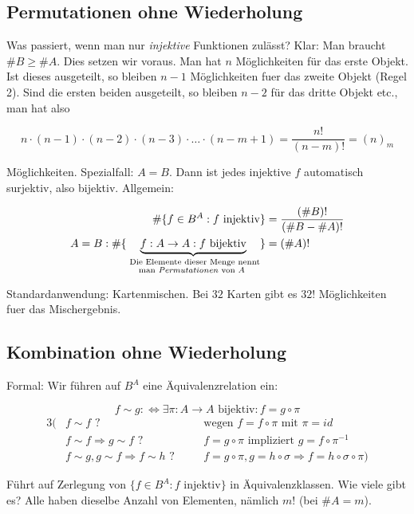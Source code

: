 \subsection{Permutationen ohne Wiederholung}

Was passiert, wenn man nur \emph{injektive} Funktionen zulässt? Klar: Man
braucht $\#B \geq \#A$. Dies setzen wir voraus. Man hat $n$ Möglichkeiten
für das erste Objekt. Ist dieses ausgeteilt, so bleiben $n-1$ Möglichkeiten
fuer das zweite Objekt (Regel 2). Sind die ersten beiden ausgeteilt, so
bleiben $n-2$ für das dritte Objekt etc., man hat also

\[ n \cdot (n-1) \cdot (n-2) \cdot (n-3) \cdot \ldots \cdot (n-m+1) =
\frac{n!}{(n-m)!} = (n)_m \]

Möglichkeiten.
Spezialfall: $A=B$. Dann ist jedes injektive $f$ automatisch surjektiv, also
bijektiv. Allgemein:

\begin{align*}
\#\{ f \in B^A : f \text{ injektiv} \} &= \frac{(\#B)!}{(\#B - \#A)!} \\
A=B : \#\{ \underbrace{f: A \to A : f \text { bijektiv}}_{ \substack{\text {
\scriptsize Die Elemente dieser Menge nennt}\\ \text{\scriptsize man \emph
{Permutationen} von $A$ }}} \} &= (\#A)!
\end{align*}

Standardanwendung: Kartenmischen. Bei $32$ Karten gibt es $32!$ Möglichkeiten
fuer das Mischergebnis.


\subsection{Kombination ohne Wiederholung}

Formal: Wir führen auf $B^A$ eine Äquivalenzrelation ein:

\[ f \sim g :\Leftrightarrow \exists \pi: A \to A \text{ bijektiv}: f = g \circ
\pi \]
\begin{alignat*}{3}
(&f \sim f  \text{ ?}&\quad
&\text{wegen } f = f \circ \pi \text{ mit } \pi = id \\
&f \sim f \Rightarrow g \sim f \text{ ? }&
&f = g \circ \pi \text{ impliziert } g = f \circ \pi^{-1} \\
&f \sim g, g \sim f \Rightarrow f \sim h \text{ ?}&
&f = g \circ \pi, g = h \circ \sigma \Rightarrow f = h \circ \sigma \circ \pi)
\end{alignat*}

Führt auf Zerlegung von $\{ f \in B^A : f \text{ injektiv}\}$ in
Äquivalenzklassen. Wie viele gibt es? Alle haben dieselbe Anzahl von
Elementen, nämlich $m!$ (bei $\#A = m$).


